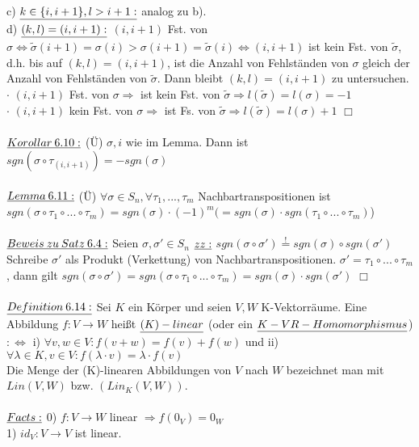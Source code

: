 \documentclass[fleqn, a4paper, 11pt]{article}
\begin{document}
c) $\uline{k\in\{i,i+1\},l>i+1:}$ analog zu b).\\
d) $\uline{(k,l)=(i,i+1):}$ $(i,i+1)$ Fst. von $\sigma\Leftrightarrow\tilde{\sigma}(i+1)=\sigma(i)>\sigma(i+1)=\tilde{\sigma}(i)\Leftrightarrow (i,i+1)$ ist kein Fst. von $\tilde{\sigma}$, d.h. bis auf $(k,l)=(i,i+1)$, ist die Anzahl von Fehlst\"anden von $\sigma$ gleich der Anzahl von Fehlst\"anden von $\tilde{\sigma}$. Dann bleibt $(k,l)=(i,i+1)$ zu untersuchen.\\
$\cdot$ $(i,i+1)$ Fst. von $\sigma\Rightarrow$ ist kein Fst. von $\tilde{\sigma}\Rightarrow l(\tilde{\sigma})=l(\sigma)=-1$\\
$\cdot$ $(i,i+1)$ kein Fst. von $\sigma\Rightarrow$ ist Fs. von $\tilde{\sigma}\Rightarrow l(\tilde{\sigma})=l(\sigma)+1$ \hfill $\Box$\\
\\
$\uline{Korollar\:6.10:}$ (\"U) $\sigma, i$ wie im Lemma. Dann ist $sgn(\sigma\circ\tau_{(i,i+1)})=-sgn(\sigma)$\\
\\
$\uline{Lemma\:6.11:}$ (\"U) $\forall\sigma\in S_n,\forall\tau_1,...,\tau_m$ Nachbartranspositionen ist $sgn(\sigma\circ\tau_1\circ...\circ\tau_m)=sgn(\sigma)\cdot(-1)^m (=sgn(\sigma)\cdot sgn(\tau_1\circ...\circ\tau_m)$)\\
\\
$\uline{Beweis\:zu\:Satz\:6.4:}$ Seien $\sigma,\sigma'\in S_n$ $\uline{zz:}$ $sgn(\sigma\circ\sigma')\stackrel{!}{=}sgn(\sigma)\circ sgn(\sigma')$\\
Schreibe $\sigma'$ als Produkt (Verkettung) von Nachbartranspositionen. $\sigma'=\tau_1\circ...\circ\tau_m$, dann gilt $sgn(\sigma\circ\sigma')=sgn(\sigma\circ\tau_1\circ...\circ\tau_m)=sgn(\sigma)\cdot sgn(\sigma')$ \hfill $\Box$\\
\\
$\uline{Definition\:6.14:}$ Sei $K$ ein K\"orper und seien $V,W$ K-Vektorr\"aume. Eine Abbildung $f:V\rightarrow W$ hei\ss{}t $\uline{(K)-linear}$ (oder ein $\uline{K-VR-Homomorphismus}$) $:\Leftrightarrow$ i) $\forall v,w\in V:f(v+w)=f(v)+f(w)$ und ii) $\forall\lambda\in K,v\in V:f(\lambda\cdot v)=\lambda\cdot f(v)$\\
Die Menge der (K)-linearen Abbildungen von $V$ nach $W$ bezeichnet man mit $Lin(V,W)$ bzw. $(Lin_K (V,W))$.\\
\\
$\uline{Facts:}$ 0) $f:V\rightarrow W$ linear $\Rightarrow f(0_V)=0_W$\\
1) $id_V:V\rightarrow V$ ist linear.\\
\end{document}
